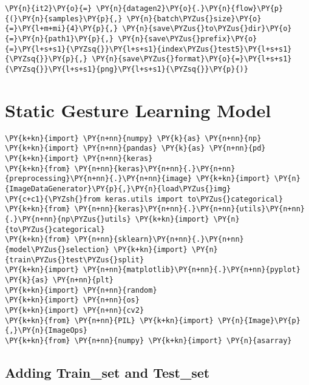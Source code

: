 \begin{tcolorbox}[breakable, size=fbox, boxrule=1pt, pad at break*=1mm,colback=cellbackground, colframe=cellborder]
\begin{Verbatim}[commandchars=\\\{\}]
    \PY{n}{it2}\PY{o}{=} \PY{n}{datagen2}\PY{o}{.}\PY{n}{flow}\PY{p}{(}\PY{n}{samples}\PY{p}{,} \PY{n}{batch\PYZus{}size}\PY{o}{=}\PY{l+m+mi}{4}\PY{p}{,} \PY{n}{save\PYZus{}to\PYZus{}dir}\PY{o}{=}\PY{n}{path1}\PY{p}{,} \PY{n}{save\PYZus{}prefix}\PY{o}{=}\PY{l+s+s1}{\PYZsq{}}\PY{l+s+s1}{index\PYZus{}test5}\PY{l+s+s1}{\PYZsq{}}\PY{p}{,} \PY{n}{save\PYZus{}format}\PY{o}{=}\PY{l+s+s1}{\PYZsq{}}\PY{l+s+s1}{png}\PY{l+s+s1}{\PYZsq{}}\PY{p}{)}
\end{Verbatim}
\end{tcolorbox}

    \hypertarget{static-gesture-learning-model}{%
\section{\texorpdfstring{\textbf{Static Gesture Learning \cite{keras}
Model}}{Static Gesture Learning Model}}\label{static-gesture-learning-model}}

    \begin{tcolorbox}[breakable, size=fbox, boxrule=1pt, pad at break*=1mm,colback=cellbackground, colframe=cellborder]
\begin{Verbatim}[commandchars=\\\{\}]
\PY{k+kn}{import} \PY{n+nn}{numpy} \PY{k}{as} \PY{n+nn}{np}
\PY{k+kn}{import} \PY{n+nn}{pandas} \PY{k}{as} \PY{n+nn}{pd}
\PY{k+kn}{import} \PY{n+nn}{keras}
\PY{k+kn}{from} \PY{n+nn}{keras}\PY{n+nn}{.}\PY{n+nn}{preprocessing}\PY{n+nn}{.}\PY{n+nn}{image} \PY{k+kn}{import} \PY{n}{ImageDataGenerator}\PY{p}{,}\PY{n}{load\PYZus{}img}
\PY{c+c1}{\PYZsh{}from keras.utils import to\PYZus{}categorical}
\PY{k+kn}{from} \PY{n+nn}{keras}\PY{n+nn}{.}\PY{n+nn}{utils}\PY{n+nn}{.}\PY{n+nn}{np\PYZus{}utils} \PY{k+kn}{import} \PY{n}{to\PYZus{}categorical}
\PY{k+kn}{from} \PY{n+nn}{sklearn}\PY{n+nn}{.}\PY{n+nn}{model\PYZus{}selection} \PY{k+kn}{import} \PY{n}{train\PYZus{}test\PYZus{}split}
\PY{k+kn}{import} \PY{n+nn}{matplotlib}\PY{n+nn}{.}\PY{n+nn}{pyplot} \PY{k}{as} \PY{n+nn}{plt}
\PY{k+kn}{import} \PY{n+nn}{random}
\PY{k+kn}{import} \PY{n+nn}{os}
\PY{k+kn}{import} \PY{n+nn}{cv2}
\PY{k+kn}{from} \PY{n+nn}{PIL} \PY{k+kn}{import} \PY{n}{Image}\PY{p}{,}\PY{n}{ImageOps}
\PY{k+kn}{from} \PY{n+nn}{numpy} \PY{k+kn}{import} \PY{n}{asarray}  
\end{Verbatim}
\end{tcolorbox}

   \subsection{ Adding Train\_set and Test\_set}

